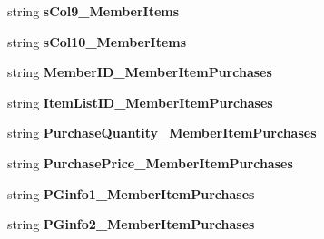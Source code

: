 \begin{DoxyCompactItemize}
\item 
string {\bfseries s\+Col9\+\_\+\+Member\+Items}\hypertarget{a00004_a73e74bdc90f37e8c776d9e11d8c11134}{}\label{a00004_a73e74bdc90f37e8c776d9e11d8c11134}

\item 
string {\bfseries s\+Col10\+\_\+\+Member\+Items}\hypertarget{a00004_ab08d0e242ead1846662b24c9aeea0f96}{}\label{a00004_ab08d0e242ead1846662b24c9aeea0f96}

\item 
string {\bfseries Member\+I\+D\+\_\+\+Member\+Item\+Purchases}\hypertarget{a00004_a199d8e167266c2b3387a75b464b4028e}{}\label{a00004_a199d8e167266c2b3387a75b464b4028e}

\item 
string {\bfseries Item\+List\+I\+D\+\_\+\+Member\+Item\+Purchases}\hypertarget{a00004_af0a2da74520df550c1c006b76d42aa04}{}\label{a00004_af0a2da74520df550c1c006b76d42aa04}

\item 
string {\bfseries Purchase\+Quantity\+\_\+\+Member\+Item\+Purchases}\hypertarget{a00004_a7ded0a3b46fa0423f7717d7cc91e722a}{}\label{a00004_a7ded0a3b46fa0423f7717d7cc91e722a}

\item 
string {\bfseries Purchase\+Price\+\_\+\+Member\+Item\+Purchases}\hypertarget{a00004_a8d1ee1d84b6ae12c559fcf62c6e16589}{}\label{a00004_a8d1ee1d84b6ae12c559fcf62c6e16589}

\item 
string {\bfseries P\+Ginfo1\+\_\+\+Member\+Item\+Purchases}\hypertarget{a00004_ac578470114a509ccbba50d650d00318f}{}\label{a00004_ac578470114a509ccbba50d650d00318f}

\item 
string {\bfseries P\+Ginfo2\+\_\+\+Member\+Item\+Purchases}\hypertarget{a00004_a678af34bb37d8b75182672d8c35c8a17}{}\label{a00004_a678af34bb37d8b75182672d8c35c8a17}


\end{DoxyCompactItemize}
